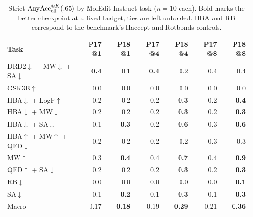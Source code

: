 \begin{table}[h]
  \centering
  \caption{Strict
  $\operatorname{AnyAcc}_{\rm all}^{@K}(.65)$ by MolEdit-Instruct task
  ($n=10$ each). Bold marks the better checkpoint at a fixed budget; ties are
  left unbolded. HBA and RB correspond to the benchmark's Haccept and Rotbonds
  controls.}
  \label{tab:editing-by-task}
  \scriptsize
  \setlength{\tabcolsep}{4pt}
  \begin{tabular}{lrrrrrr}
    \toprule
    Task & P17 @1 & P18 @1 & P17 @4 & P18 @4 & P17 @8 & P18 @8 \\
    \midrule
    DRD2$\downarrow$ + MW$\downarrow$ + SA$\downarrow$
      & \textbf{0.4} & 0.1 & \textbf{0.4} & 0.2 & 0.4 & 0.4 \\
    GSK3B$\uparrow$
      & 0.0 & 0.0 & 0.0 & 0.0 & 0.0 & 0.0 \\
    HBA$\downarrow$ + LogP$\uparrow$
      & 0.2 & 0.2 & 0.2 & \textbf{0.3} & 0.2 & \textbf{0.4} \\
    HBA$\downarrow$ + MW$\downarrow$
      & 0.2 & 0.2 & 0.2 & \textbf{0.3} & 0.2 & \textbf{0.3} \\
    HBA$\downarrow$ + SA$\downarrow$
      & 0.1 & \textbf{0.3} & 0.2 & \textbf{0.6} & 0.3 & \textbf{0.6} \\
    HBA$\uparrow$ + MW$\uparrow$ + QED$\downarrow$
      & 0.2 & 0.2 & 0.2 & 0.2 & 0.3 & 0.3 \\
    MW$\uparrow$
      & 0.3 & \textbf{0.4} & 0.4 & \textbf{0.7} & 0.4 & \textbf{0.9} \\
    QED$\uparrow$ + SA$\downarrow$
      & 0.2 & 0.2 & 0.2 & \textbf{0.3} & 0.2 & \textbf{0.3} \\
    RB$\downarrow$
      & 0.0 & 0.0 & 0.0 & 0.0 & 0.0 & \textbf{0.1} \\
    SA$\downarrow$
      & 0.1 & \textbf{0.2} & 0.1 & \textbf{0.3} & 0.1 & \textbf{0.3} \\
    \midrule
    Macro
      & 0.17 & \textbf{0.18} & 0.19 & \textbf{0.29}
      & 0.21 & \textbf{0.36} \\
    \bottomrule
  \end{tabular}
\end{table}
